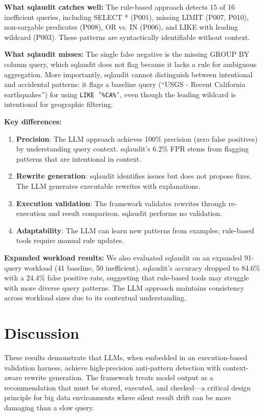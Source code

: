 \documentclass[conference]{IEEEtran}
\begin{document}
\noindent\textbf{What sqlaudit catches well:} The rule-based approach detects 15 of 16 inefficient queries, including SELECT * (P001), missing LIMIT (P007, P010), non-sargable predicates (P008), OR vs. IN (P006), and LIKE with leading wildcard (P003). These patterns are syntactically identifiable without context.

\noindent\textbf{What sqlaudit misses:} The single false negative is the missing GROUP BY column query, which sqlaudit does not flag because it lacks a rule for ambiguous aggregation. More importantly, sqlaudit cannot distinguish between intentional and accidental patterns: it flags a baseline query (``USGS - Recent California earthquakes'') for using \texttt{LIKE '\%CA\%'}, even though the leading wildcard is intentional for geographic filtering.

\noindent\textbf{Key differences:}
\begin{enumerate}
    \item \textbf{Precision}: The LLM approach achieves 100\% precision (zero false positives) by understanding query context. sqlaudit's 6.2\% FPR stems from flagging patterns that are intentional in context.
    \item \textbf{Rewrite generation}: sqlaudit identifies issues but does not propose fixes. The LLM generates executable rewrites with explanations.
    \item \textbf{Execution validation}: The framework validates rewrites through re-execution and result comparison. sqlaudit performs no validation.
    \item \textbf{Adaptability}: The LLM can learn new patterns from examples; rule-based tools require manual rule updates.
\end{enumerate}

\noindent\textbf{Expanded workload results:} We also evaluated sqlaudit on an expanded 91-query workload (41 baseline, 50 inefficient). sqlaudit's accuracy dropped to 84.6\% with a 24.4\% false positive rate, suggesting that rule-based tools may struggle with more diverse query patterns. The LLM approach maintains consistency across workload sizes due to its contextual understanding.

\section{Discussion}
These results demonstrate that LLMs, when embedded in an execution-based validation harness, achieve high-precision anti-pattern detection with context-aware rewrite generation. The framework treats model output as a recommendation that must be stored, executed, and checked---a critical design principle for big data environments where silent result drift can be more damaging than a slow query.
\end{document}
